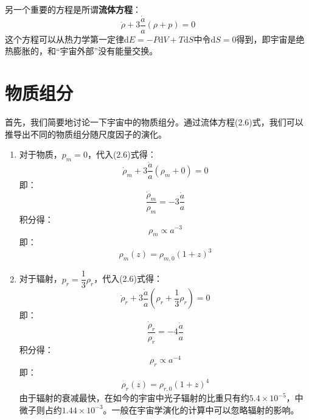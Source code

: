 \documentclass[fontset=none,openany,a4paper]{ctexbook}
\begin{document}
另一个重要的方程是所谓\textbf{流体方程}：
\begin{equation}
    \dot{\rho} + 3\frac{\dot{a}}{a}\left(\rho + p\right) = 0
\end{equation}
这个方程可以从热力学第一定律$\mathrm{d}E = -P\mathrm{d}V + T\mathrm{d}S$中令$\mathrm{d}S = 0$得到，即宇宙是绝热膨胀的，和“宇宙外部”没有能量交换。

\section{物质组分}

首先，我们简要地讨论一下宇宙中的物质组分。通过流体方程(2.6)式，我们可以推导出不同的物质组分随尺度因子的演化。

\begin{enumerate}
    \item 对于物质，$p_m = 0$，代入(2.6)式得：
    \begin{equation}
        \dot{\rho}_m + 3\frac{\dot{a}}{a}\left(\rho_m + 0\right) = 0
    \end{equation}
    即：
    \begin{equation}
        \frac{\dot{\rho}_m}{\rho_m} = -3\frac{\dot{a}}{a}
    \end{equation}
    积分得：
    \begin{equation}
        \rho_m \propto a^{-3}
    \end{equation}
    即：
    \begin{equation}
        \rho_m(z) = \rho_{m,0}(1 + z)^3
    \end{equation}

    \item 对于辐射，$p_r = \dfrac{1}{3}\rho_r$，代入(2.6)式得：
    \begin{equation}
        \dot{\rho}_r + 3\frac{\dot{a}}{a}\left(\rho_r + \frac{1}{3}\rho_r\right) = 0
    \end{equation}
    即：
    \begin{equation}
        \frac{\dot{\rho}_r}{\rho_r} = -4\frac{\dot{a}}{a}
    \end{equation}
    积分得：
    \begin{equation}
        \rho_r \propto a^{-4}
    \end{equation}
    即：
    \begin{equation}
        \rho_r(z) = \rho_{r,0}(1 + z)^4
    \end{equation}
    由于辐射的衰减最快，在如今的宇宙中光子辐射的比重只有约$5.4 \times 10^{-5}$，中微子则占约$1.44 \times 10^{-3}$。一般在宇宙学演化的计算中可以忽略辐射的影响。


\end{enumerate}
\end{document}
